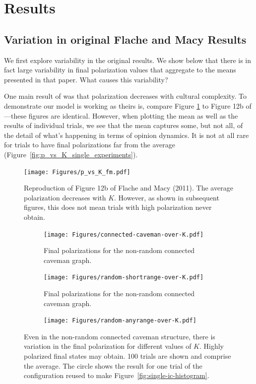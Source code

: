 \documentclass[11pt,letterpaper]{article}
\begin{document}
\section{Results}

\subsection{Variation in original Flache and Macy Results}

We first explore variability in the original  results.
We show below that there is in fact large variability in final polarization
values that aggregate to the means presented in that paper. What causes
this variability? 

One main result of
 was that polarization decreases with cultural complexity.
To demonstrate our model is working as theirs is, compare Figure 
\ref{fig:p_vs_K_fm} to Figure 12b of ---these figures
are identical.
However, when plotting the mean as well as the results of individual trials,
we see that the mean captures some, but not all, of the detail of what's 
happening in terms of opinion dynamics. It is not at all rare for trials to
have final polarizations far from the average 
(Figure~\ref{fig:p_vs_K_single_experiments}). 


\begin{figure}
  \centering
    \texttt{[image: Figures/p\_vs\_K\_fm.pdf]}
  \caption{Reproduction of Figure 12b of Flache and Macy (2011). The average
    polarization decreases with $K$. However, as shown in subsequent figures,
    this does not mean trials with high polarization never obtain.
  }
  \label{fig:p_vs_K_fm}
\end{figure}


\begin{figure}[h!]
  \centering
    \begin{subfigure}[t]{\textwidth}
      \centering
      \texttt{[image: Figures/connected-caveman-over-K.pdf]}
      \caption{Final polarizations for the non-random connected caveman graph.}
      \label{fig:connected-caveman-trials}
    \end{subfigure}
    \begin{subfigure}[t]{\textwidth}
      \centering
      \texttt{[image: Figures/random-shortrange-over-K.pdf]}
      \caption{Final polarizations for the non-random connected caveman graph.}
      \label{fig:random-shortrange-trials}
    \end{subfigure}
    \begin{subfigure}[t]{\textwidth}
      \centering
      \texttt{[image: Figures/random-anyrange-over-K.pdf]}
      \caption{}
      \label{fig:random-anyrange-trials}
    \end{subfigure}
  \caption{Even in the non-random connected caveman structure, there is 
    variation in the final polarization for different values of $K$. Highly
    polarized final states may obtain. 100 trials are shown and comprise the
    average. The circle shows the result for one trial of the configuration
    reused to make Figure~\ref{fig:single-ic-histogram}.
  }
  \label{fig:single-experiments-over-k}
\end{figure}
\end{document}
